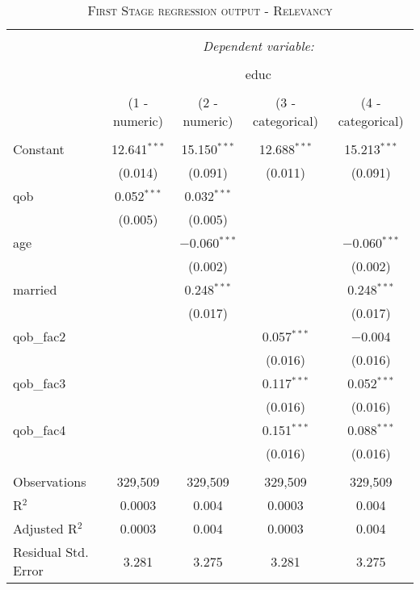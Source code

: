 \documentclass[a4paper]{article}
\begin{document}
\begin{table}[!htbp] \centering 
\begin{adjustwidth}{0.cm}{-0cm}
\begin{threeparttable}
\small
\captionsetup{font=small, justification=raggedright,singlelinecheck=false}
\caption{\textsc{First Stage regression output - Relevancy}}
\centering 
  \label{}
\small 
\begin{tabular}{@{\extracolsep{25pt}}lcccc} 
\\[-5.8ex]\hline 
\hline \\[-1.8ex] 
 & \multicolumn{4}{c}{\textit{Dependent variable:}} \\ 
\cline{2-5} 
\\[-1.8ex] & \multicolumn{4}{c}{educ} \\ 
\\[-1.8ex] & (1 - numeric) & (2 - numeric) & (3 - categorical) & (4 - categorical)\\ 
\hline \\[-1.8ex] 
 Constant & 12.641$^{***}$ & 15.150$^{***}$ & 12.688$^{***}$ & 15.213$^{***}$ \\ 
  & (0.014) & (0.091) & (0.011) & (0.091) \\ 
  qob & 0.052$^{***}$ & 0.032$^{***}$ &  &  \\ 
  & (0.005) & (0.005) &  &  \\ 
  age &  & $-$0.060$^{***}$ &  & $-$0.060$^{***}$ \\ 
  &  & (0.002) &  & (0.002) \\ 
  married &  & 0.248$^{***}$ &  & 0.248$^{***}$ \\ 
  &  & (0.017) &  & (0.017) \\ 
  qob\_fac2 &  &  & 0.057$^{***}$ & $-$0.004 \\ 
  &  &  & (0.016) & (0.016) \\ 
  qob\_fac3 &  &  & 0.117$^{***}$ & 0.052$^{***}$ \\ 
  &  &  & (0.016) & (0.016) \\ 
  qob\_fac4 &  &  & 0.151$^{***}$ & 0.088$^{***}$ \\ 
  &  &  & (0.016) & (0.016) \\ 
 \hline \\[-1.8ex] 
Observations & 329,509 & 329,509 & 329,509 & 329,509 \\ 
R$^{2}$ & 0.0003 & 0.004 & 0.0003 & 0.004 \\ 
Adjusted R$^{2}$ & 0.0003 & 0.004 & 0.0003 & 0.004 \\ 
Residual Std. Error & 3.281 & 3.275 & 3.281  & 3.275  \\ 

\end{tabular}
\end{threeparttable}
\end{adjustwidth}
\end{table}
\end{document}

